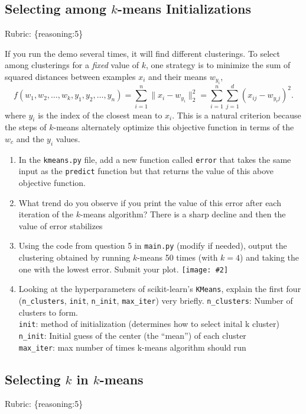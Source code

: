 \documentclass{article}
\def\rubric#1{\gre{Rubric: \{#1\}}}{}
\def\blu#1{{\color{blu}#1}}
\def\gre#1{{\color{gre}#1}}
\def\red#1{{\color{red}#1}}
\def\norm#1{\|#1\|}
\newcommand{\fig}[2]{\texttt{[image: \#2]}}
\def\enum#1{\begin{enumerate}#1\end{enumerate}}
\begin{document}
\subsection{Selecting among $k$-means Initializations}
\rubric{reasoning:5}

If you run the demo several times, it will find different clusterings. To select among clusterings for a \emph{fixed} value of $k$, one strategy is to minimize the sum of squared distances between examples $x_i$ and their means $w_{y_i}$,
\[
f(w_1,w_2,\dots,w_k,y_1,y_2,\dots,y_n) = \sum_{i=1}^n \norm{x_i - w_{y_i}}_2^2 = \sum_{i=1}^n \sum_{j=1}^d (x_{ij} - w_{y_ij})^2.
\]
 where $y_i$ is the index of the closest mean to $x_i$. This is a natural criterion because the steps of $k$-means alternately optimize this objective function in terms of the $w_c$ and the $y_i$ values.

 \blu{\enum{
 \item In the \texttt{kmeans.py} file, add a new function called \texttt{error} that takes the same input as the \texttt{predict} function but that returns the value of this above objective function. 
 \item What trend do you observe if you print the value of this error after each iteration of the $k$-means algorithm? \red{There is a sharp decline and then the value of error stabilizes}
 \item Using the code from question 5 in \texttt{main.py} (modify if needed), output the clustering obtained by running $k$-means 50 times (with $k=4$) and taking the one with the lowest error. Submit your plot.
 \fig{.49}{./figs/kmeans_50_runs.png}
 \item Looking at the hyperparameters of scikit-learn's \texttt{KMeans}, explain the first four (\texttt{n\_clusters}, \texttt{init}, \texttt{n\_init}, \texttt{max\_iter}) very briefly. \red{\texttt{n\_clusters}: Number of clusters to form. \\
 \texttt{init}: method of initialization (determines how to select inital k cluster) \\ \texttt{n\_init}: Initial guess of the center (the “mean”) of each cluster \\ \texttt{max\_iter}: max number of times k-means algorithm should run}
 }}


 \subsection{Selecting $k$ in $k$-means}
\rubric{reasoning:5}
\end{document}
